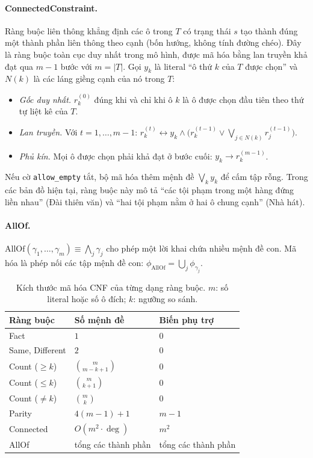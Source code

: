 \paragraph{ConnectedConstraint.}
Ràng buộc liên thông khẳng định các ô trong $T$ có trạng thái $s$ tạo thành
đúng một thành phần liên thông theo cạnh (bốn hướng, không tính đường chéo).
Đây là ràng buộc toàn cục duy nhất trong mô hình, được mã hóa bằng lan truyền
khả đạt qua $m-1$ bước với $m = |T|$. Gọi $y_k$ là literal ``ô thứ $k$ của $T$
được chọn'' và $N(k)$ là các láng giềng cạnh của nó trong $T$:
\begin{itemize}
  \item \emph{Gốc duy nhất.} $r_k^{(0)}$ đúng khi và chỉ khi ô $k$ là ô được
    chọn đầu tiên theo thứ tự liệt kê của $T$.
  \item \emph{Lan truyền.} Với $t = 1,\ldots,m-1$:
    $r_k^{(t)} \leftrightarrow y_k \land \bigl(r_k^{(t-1)} \lor
    \bigvee_{j \in N(k)} r_j^{(t-1)}\bigr)$.
  \item \emph{Phủ kín.} Mọi ô được chọn phải khả đạt ở bước cuối:
    $y_k \rightarrow r_k^{(m-1)}$.
\end{itemize}
Nếu cờ \texttt{allow\_empty} tắt, bộ mã hóa thêm mệnh đề
$\bigvee_k y_k$ để cấm tập rỗng. Trong các bản đồ hiện tại, ràng buộc này mô tả
``các tội phạm trong một hàng đứng liền nhau'' (Đài thiên văn) và ``hai tội
phạm nằm ở hai ô chung cạnh'' (Nhà hát).

\paragraph{AllOf.}
$\mathrm{AllOf}(\gamma_1,\ldots,\gamma_m) \equiv \bigwedge_{j} \gamma_j$ cho
phép một lời khai chứa nhiều mệnh đề con. Mã hóa là phép nối các tập mệnh đề
con: $\phi_{\mathrm{AllOf}} = \bigcup_j \phi_{\gamma_j}$.

\begin{table}[htbp]
  \centering
  \caption{Kích thước mã hóa CNF của từng dạng ràng buộc. $m$: số literal hoặc
    số ô đích; $k$: ngưỡng so sánh.}
  \label{tab:constraint_summary}
  \begin{tabular}{lll}
    \toprule
    \textbf{Ràng buộc} & \textbf{Số mệnh đề} & \textbf{Biến phụ trợ} \\
    \midrule
    Fact                     & $1$ & $0$ \\
    Same, Different          & $2$ & $0$ \\
    Count ($\ge k$)          & $\binom{m}{m-k+1}$ & $0$ \\
    Count ($\le k$)          & $\binom{m}{k+1}$ & $0$ \\
    Count ($\ne k$)          & $\binom{m}{k}$ & $0$ \\
    Parity                   & $4(m-1)+1$ & $m-1$ \\
    Connected                & $O(m^2 \cdot \deg)$ & $m^2$ \\
    AllOf                    & tổng các thành phần & tổng các thành phần \\
    \bottomrule
  \end{tabular}
\end{table}
